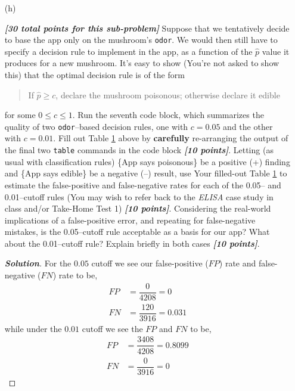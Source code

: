 \documentclass[12pt]{article}
\newenvironment{solution}{\begin{tcolorbox}[breakable]\begin{proof}[\textbf{\textit{Solution}}] }{\end{proof}\end{tcolorbox}}
\newcommand{\bi}[1]{\textbf{\textit{#1}}}
\begin{document}
\begin{itemize}
\begin{table}[t!]
\begin{tabular}{c|c}
\end{tabular}

\label{t:decision-rules-1}

\end{table}

\item[(h)]

\bi{[30 total points for this sub-problem]} Suppose that we tentatively decide to base the app only on the mushroom's \texttt{odor}. We would then still have to specify a decision rule to implement in the app, as a function of the $\hat{ p }$ value it produces for a new mushroom. It's easy to show (You're not asked to show this) that the optimal decision rule is of the form

\begin{quote}

If $\hat{ p } \ge c$, declare the mushroom poisonous; otherwise declare it edible

\end{quote}

for some $0 \le c \le 1$. Run the seventh code block, which summarizes the quality of two \texttt{odor}--based decision rules, one with $c = 0.05$ and the other with $c = 0.01$. Fill out Table \ref{t:decision-rules-1} above by \textbf{carefully} re-arranging the output of the final two \texttt{table} commands in the code block \bi{[10 points]}. Letting (as usual with classification rules) \{App says poisonous\} be a positive (+) finding and \{App says edible\} be a negative (--) result, use Your filled-out Table \ref{t:decision-rules-1} to estimate the false-positive and false-negative rates for each of the 0.05-- and 0.01--cutoff rules  (You may wish to refer back to the \textit{ELISA} case study in class and/or Take-Home Test 1) \bi{[10 points]}. Considering the real-world implications of a false-positive error, and repeating for false-negative mistakes, is the 0.05--cutoff rule acceptable as a basis for our app? What about the 0.01--cutoff rule? Explain briefly in both cases \bi{[10 points]}.

\begin{solution}
    For the $0.05$ cutoff we see our false-positive ($FP$) rate and false-negative ($FN$) rate to be,
    \begin{align*}
        FP &= \dfrac{0}{4208} = 0 \\
        FN &= \dfrac{120}{3916} = 0.031
    \end{align*}
    while under the $0.01$ cutoff we see the $FP$ and $FN$ to be,
    \begin{align*}
        FP &= \dfrac{3408}{4208} = 0.8099 \\
        FN &= \dfrac{0}{3916} = 0 
    \end{align*}


\end{solution}
\end{itemize}
\end{document}
